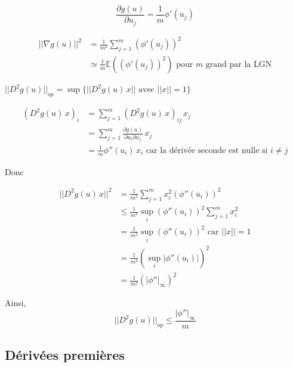 \documentclass[a4paper, 11pt, french]{article}
\theoremstyle{definition}
\begin{document}
\[\frac{\partial g(u)}{\partial u_j} = \frac{1}{m} \phi '(u_j)\]

\begin{align}
	||\nabla g(u) ||^2 &= \frac{1}{m^2} \sum_{j=1}^{m} (\phi '(u_j))^2 \\
	&\simeq \frac{1}{m} \mathbb{E}((\phi '(u_j))^2) \text{ pour $m$ grand par la LGN}
\end{align}

$||D^2 g(u)||_{op} = \sup \{||D^2 g(u) \, x|| \text{ avec } ||x|| = 1\}$

\begin{align}
	(D^2 g(u) \, x)_i &= \sum_{j=1}^{m} (D^2 g(u) \, x)_{ij} \, x_j \\
	&= \sum_{j=1}^{m} \frac{\partial g(u)}{\partial u_i \partial u_j} \, x_j \\
	&= \frac{1}{m} \phi ''(u_i) \, x_i \text{ car la dérivée seconde est nulle si $i \neq j$}
\end{align}

Donc

\begin{align*}
	||D^2 g(u) \, x||^2 &= \frac{1}{m^2} \sum_{j=1}^{m} x_i^2 (\phi ''(u_i))^2 \\
	&\leq \frac{1}{m^2} \sup_i (\phi ''(u_i))^2 \sum_{j=1}^{m} x_i^2 \\
	&= \frac{1}{m^2} \sup_i (\phi ''(u_i))^2 \text{ car $||x|| = 1$} \\
	&= \frac{1}{m^2} (\sup_i |\phi ''(u_i)|)^2 \\
	&= \frac{1}{m^2} (|\phi ''|_{\infty})^2
\end{align*}

Ainsi, \[||D^2 g(u)||_{op} \leq \frac{|\phi ''|_{\infty}}{m}\]

\subsection{Dérivées premières}
\end{document}
